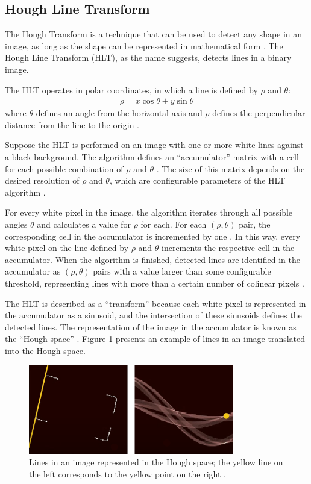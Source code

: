 \subsection{Hough Line Transform}

The Hough Transform is a technique that can be used to detect any shape in an image, as long as the shape can be represented in mathematical form \cite{opencv_hlt}. The Hough Line Transform (HLT), as the name suggests, detects lines in a binary image.

The HLT operates in polar coordinates, in which a line is defined by $\rho$ and $\theta$:
\begin{align}
  \rho = x \cos\theta + y \sin\theta
\end{align}
where $\theta$ defines an angle from the horizontal axis and $\rho$ defines the perpendicular distance from the line to the origin \cite{opencv_hlt}.

Suppose the HLT is performed on an image with one or more white lines against a black background. The algorithm defines an ``accumulator'' matrix with a cell for each possible combination of $\rho$ and $\theta$ \cite{opencv_hlt}. The size of this matrix depends on the desired resolution of $\rho$ and $\theta$, which are configurable parameters of the HLT algorithm \cite{opencv_hlt}.

For every white pixel in the image, the algorithm iterates through all possible angles $\theta$ and calculates a value for $\rho$ for each. For each $(\rho,\theta)$ pair, the corresponding cell in the accumulator is incremented by one \cite{opencv_hlt}. In this way, every white pixel on the line defined by $\rho$ and $\theta$ increments the respective cell in the accumulator. When the algorithm is finished, detected lines are identified in the accumulator as $(\rho,\theta)$ pairs with a value larger than some configurable threshold, representing lines with more than a certain number of colinear pixels \cite{opencv_hlt}.

The HLT is described as a ``transform'' because each white pixel is represented in the accumulator as a sinusoid, and the intersection of these sinusoids defines the detected lines. The representation of the image in the accumulator is known as the ``Hough space'' \cite{opencv_hlt}. Figure \ref{fig:hough_line} presents an example of lines in an image translated into the Hough space.

\begin{figure}[ht]
  \centering
  \includegraphics[width=0.8\textwidth]{images/hough_transform.png}
  \caption{Lines in an image represented in the Hough space; the yellow line on the left corresponds to the yellow point on the right \cite{korting_2016}.}
  \label{fig:hough_line}
\end{figure}

